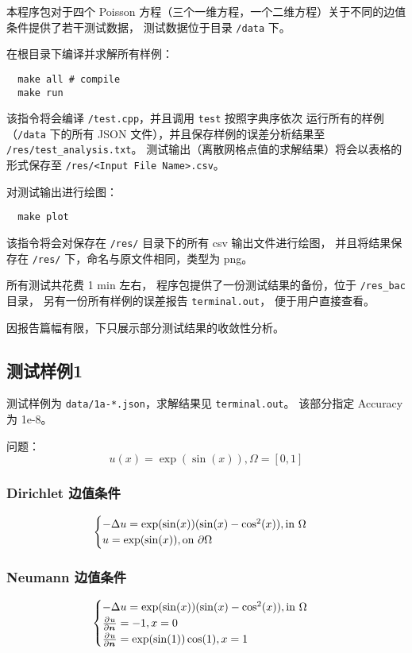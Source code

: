 \documentclass[lang=cn,a4paper,newtx,bibend=bibtex]{elegantpaper}
\begin{document}
本程序包对于四个 Poisson 方程（三个一维方程，一个二维方程）关于不同的边值条件提供了若干测试数据，
测试数据位于目录 \texttt{/data} 下。

在根目录下编译并求解所有样例：
\begin{lstlisting}
  make all # compile
  make run
\end{lstlisting}

该指令将会编译 \texttt{/test.cpp}，并且调用 \texttt{test} 按照字典序依次
运行所有的样例（\texttt{/data} 下的所有 JSON 文件），并且保存样例的误差分析结果至 \texttt{/res/test\_analysis.txt}。
测试输出（离散网格点值的求解结果）将会以表格的形式保存至 \texttt{/res/<Input File Name>.csv}。

对测试输出进行绘图：
\begin{lstlisting}
  make plot
\end{lstlisting}

该指令将会对保存在 \texttt{/res/} 目录下的所有 csv 输出文件进行绘图，
并且将结果保存在 \texttt{/res/} 下，命名与原文件相同，类型为 png。

所有测试共花费 1 min 左右，
程序包提供了一份测试结果的备份，位于 \texttt{/res\_bac} 目录，
另有一份所有样例的误差报告 \texttt{terminal.out}，
便于用户直接查看。

因报告篇幅有限，下只展示部分测试结果的收敛性分析。

\subsection{测试样例1}

测试样例为 \texttt{data/1a-*.json}，求解结果见 \texttt{terminal.out}。
该部分指定 Accuracy 为 1e-8。

问题： 
\[
  u(x) = \exp(\sin(x)), \Omega = [0, 1]
\]

\subsubsection{Dirichlet 边值条件}

\[
  \begin{cases} 
  -\Delta u = \exp(\sin(x)) (\sin(x) - \cos^2(x)), \text{in} ~\Omega \\
  u = \exp(\sin(x)), \text{on}~\partial \Omega
   \end{cases}
\]


\subsubsection{Neumann 边值条件}

\[
  \begin{cases} 
  -\Delta u = \exp(\sin(x)) (\sin(x) - \cos^2(x)), \text{in} ~\Omega \\
  \frac{\partial^{}{u}}{\partial {\bm{n}}^{}} = -1, x = 0 \\
  \frac{\partial^{}{u}}{\partial {\bm{n}}^{}} = \exp(\sin(1))\cos(1), x = 1
   \end{cases}
\]
\end{document}
